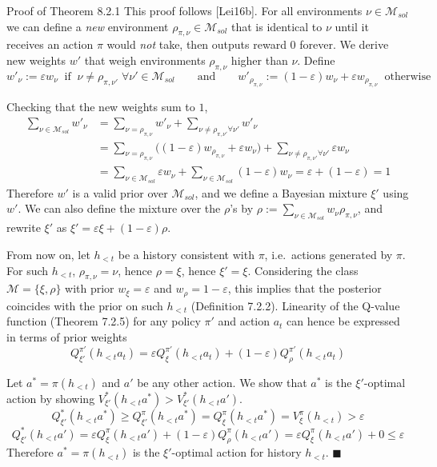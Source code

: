 \documentclass[aspectratio=169,10pt]{beamer}
\newcommand{\Msol}{\mathcal{M}_{sol}}
\begin{document}
\begin{frame}[allowframebreaks]{Proof of Theorem 8.2.1}
  This proof follows [Lei16b]. For all environments $\nu\in\Msol$ we can
  define a \emph{new} environment $\rho_{\pi,\nu}\in\Msol$ that is
  identical to $\nu$ until it receives an action $\pi$ would \emph{not}
  take, then outputs reward $0$ forever. We derive new weights $w'$ that
  weigh environments $\rho_{\pi,\nu}$ higher than $\nu$. Define
  $$w'_\nu := \varepsilon w_\nu \;\;\text{if}\;\; \nu\ne\rho_{\pi,\nu'}\;\forall\nu'\in\Msol
  \qquad\text{and}\qquad w'_{\rho_{\pi,\nu}} := (1-\varepsilon)w_\nu + \varepsilon w_{\rho_{\pi,\nu}} \;\;\text{otherwise}$$

  Checking that the new weights sum to $1$,
  \begin{align*}
    \sum_{\nu\in\Msol} w'_\nu &= \sum_{\nu=\rho_{\pi,\nu}} w'_\nu + \sum_{\nu\ne\rho_{\pi,\nu'}\forall\nu'} w'_\nu \\
    &= \sum_{\nu=\rho_{\pi,\nu}}\big((1-\varepsilon)w_{\rho_{\pi,\nu}} + \varepsilon w_\nu\big) + \sum_{\nu\ne\rho_{\pi,\nu'}\forall\nu'} \varepsilon w_\nu \\
    &= \sum_{\nu\in\Msol}\varepsilon w_\nu + \sum_{\nu\in\Msol}(1-\varepsilon)w_\nu
    = \varepsilon + (1-\varepsilon) = 1
  \end{align*}
  Therefore $w'$ is a valid prior over $\Msol$, and we define a Bayesian
  mixture $\xi'$ using $w'$. We can also define the mixture over the
  $\rho$'s by $\rho := \sum_{\nu\in\Msol} w_\nu\rho_{\pi,\nu}$, and rewrite
  $\xi'$ as $\xi' = \varepsilon\xi + (1-\varepsilon)\rho$.

  \framebreak

  From now on, let $h_{<t}$ be a history consistent with $\pi$, i.e.\
  actions generated by $\pi$. For such $h_{<t}$, $\rho_{\pi,\nu}=\nu$, hence
  $\rho=\xi$, hence $\xi'=\xi$. Considering the class
  $\mathcal{M}=\{\xi,\rho\}$ with prior $w_\xi=\varepsilon$ and
  $w_\rho=1-\varepsilon$, this implies that the posterior coincides with
  the prior on such $h_{<t}$ (Definition 7.2.2). Linearity of the Q-value
  function (Theorem 7.2.5) for any policy $\pi'$ and action $a_t$ can hence
  be expressed in terms of prior weights
  $$Q_{\xi'}^{\pi'}(h_{<t}a_t) = \varepsilon Q_\xi^{\pi'}(h_{<t}a_t) + (1-\varepsilon)Q_\rho^{\pi'}(h_{<t}a_t)$$

  Let $a^*=\pi(h_{<t})$ and $a'$ be any other action. We show that $a^*$ is
  the $\xi'$-optimal action by showing $V_{\xi'}^*(h_{<t}a^*) >
  V_{\xi'}^*(h_{<t}a')$.
  $$Q_{\xi'}^*(h_{<t}a^*) \ge Q_{\xi'}^\pi(h_{<t}a^*) = Q_\xi^\pi(h_{<t}a^*) = V_\xi^\pi(h_{<t}) > \varepsilon$$
  $$Q_{\xi'}^*(h_{<t}a') = \varepsilon Q_\xi^\pi(h_{<t}a') + (1-\varepsilon)Q_\rho^\pi(h_{<t}a') = \varepsilon Q_\xi^\pi(h_{<t}a') + 0 \le \varepsilon$$
  Therefore $a^* = \pi(h_{<t})$ is the $\xi'$-optimal action for history
  $h_{<t}$. $\blacksquare$
\end{frame}
\end{document}
